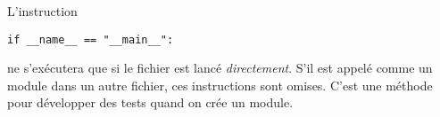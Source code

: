 \documentclass[a4paper,11pt]{article}
\begin{document}
\begin{Form}
L'instruction
\begin{lstlisting}
if __name__ == "__main__":
\end{lstlisting}
ne s'exécutera que si le fichier est lancé \emph{directement}. S'il est appelé comme un module dans un autre fichier, ces instructions sont omises. C'est une méthode pour développer des tests quand on crée un module.
\begin{exo}[Activité]

\end{exo}
\begin{exo}[Activité]

\end{exo}
\end{Form}
\end{document}
